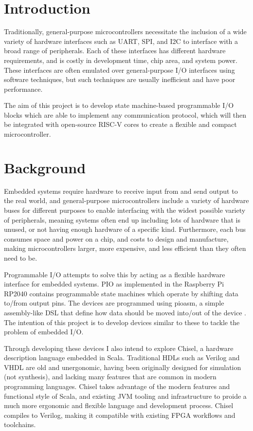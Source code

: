 \documentclass[a4paper,fleqn,12pt]{article}
\begin{document}


\pagestyle{plain}

\section{Introduction}

Traditionally, general-purpose microcontrollers necessitate the inclusion of a wide variety of hardware interfaces such as UART, SPI, and I2C to interface with a broad range of peripherals. Each of these interfaces has different hardware requirements, and is costly in development time, chip area, and system power. These interfaces are often emulated over general-purpose I/O interfaces using software techniques, but such techniques are usually inefficient and have poor performance.

The aim of this project is to develop state machine-based programmable I/O blocks which are able to implement any communication protocol, which will then be integrated with open-source RISC-V cores to create a flexible and compact microcontroller.

\section{Background}

Embedded systems require hardware to receive input from and send output to the real world, and general-purpose microcontrollers include a variety of hardware buses for different purposes to enable interfacing with the widest possible variety of peripherals, meaning systems often end up including lots of hardware that is unused, or not having enough hardware of a specific kind. Furthermore, each bus consumes space and power on a chip, and costs to design and manufacture, making microcontrollers larger, more expensive, and less efficient than they often need to be.

Programmable I/O attempts to solve this by acting as a flexible hardware interface for embedded systems. PIO as implemented in the Raspberry Pi RP2040 contains programmable state machines which operate by shifting data to/from output pins. The devices are programmed using pioasm, a simple assembly-like DSL that define how data should be moved into/out of the device \cite{rp2040}. The intention of this project is to develop devices similar to these to tackle the problem of embedded I/O.

Through developing these devices I also intend to explore Chisel, a hardware description language embedded in Scala. Traditional HDLs such as Verilog and VHDL are old and unergonomic, having been originally designed for simulation (not synthesis), and lacking many features that are common in modern programming languages. Chisel takes advantage of the modern features and functional style of Scala, and existing JVM tooling and infrastructure to proide a much more ergonomic and flexible language and development process. Chisel compiles to Verilog, making it compatible with existing FPGA workflows and toolchains.
\end{document}
